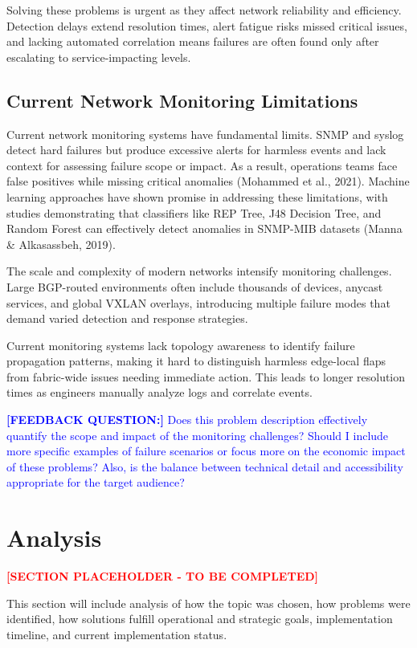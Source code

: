 \documentclass[11pt]{article}
\begin{document}
Solving these problems is urgent as they affect network reliability and efficiency. Detection delays extend resolution times, alert fatigue risks missed critical issues, and lacking automated correlation means failures are often found only after escalating to service-impacting levels.

\subsection{Current Network Monitoring Limitations}

Current network monitoring systems have fundamental limits. SNMP and syslog detect hard failures but produce excessive alerts for harmless events and lack context for assessing failure scope or impact. As a result, operations teams face false positives while missing critical anomalies (Mohammed et al., 2021). Machine learning approaches have shown promise in addressing these limitations, with studies demonstrating that classifiers like REP Tree, J48 Decision Tree, and Random Forest can effectively detect anomalies in SNMP-MIB datasets (Manna \& Alkasassbeh, 2019).

The scale and complexity of modern networks intensify monitoring challenges. Large BGP-routed environments often include thousands of devices, anycast services, and global VXLAN overlays, introducing multiple failure modes that demand varied detection and response strategies.

Current monitoring systems lack topology awareness to identify failure propagation patterns, making it hard to distinguish harmless edge-local flaps from fabric-wide issues needing immediate action. This leads to longer resolution times as engineers manually analyze logs and correlate events.

\textcolor{blue}{\textbf{[FEEDBACK QUESTION:]} Does this problem description effectively quantify the scope and impact of the monitoring challenges? Should I include more specific examples of failure scenarios or focus more on the economic impact of these problems? Also, is the balance between technical detail and accessibility appropriate for the target audience?}

\section{Analysis}

\textcolor{red}{\textbf{[SECTION PLACEHOLDER - TO BE COMPLETED]}}

This section will include analysis of how the topic was chosen, how problems were identified, how solutions fulfill operational and strategic goals, implementation timeline, and current implementation status.
\end{document}
